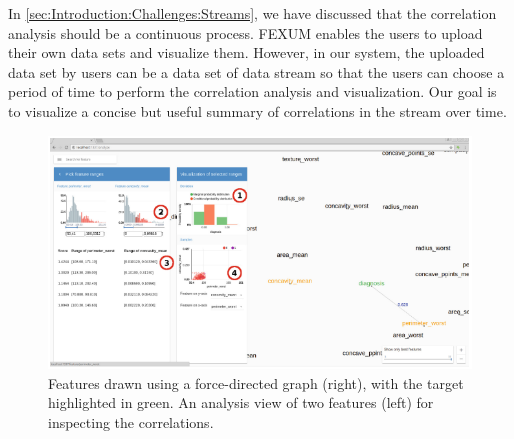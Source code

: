 In \autoref{sec:Introduction:Challenges:Streams}, we have discussed that the correlation analysis should be a continuous process. FEXUM enables the users to upload their own data sets and visualize them. However, in our system, the uploaded data set by users can be a data set of data stream so that the users can choose a period of time to perform the correlation analysis and visualization. Our goal is to visualize a concise but useful summary of correlations in the stream over time.\\
\begin{figure}[h]
	\centering
	\includegraphics[width=\textwidth]{pictures/FEXUM}
	\caption{Features drawn using a force-directed graph (right), with the target highlighted in green. An analysis view of two features (left) for inspecting the correlations.\cite{FEXUM}}
	\label{fig:FEXUM}
\end{figure}